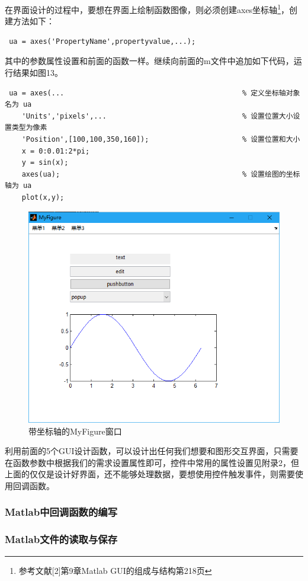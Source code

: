 \begin{enumerate}
	\qquad 在界面设计的过程中，要想在界面上绘制函数图像，则必须创建axes坐标轴\footnote{参考文献[2]第9章Matlab GUI的组成与结构第218页}，创建方法如下：
	\begin{lstlisting}
 ua = axes('PropertyName',propertyvalue,...);\end{lstlisting}
 	其中的参数属性设置和前面的函数一样。继续向前面的m文件中追加如下代码，运行结果如图13。
	 \begin{lstlisting}
 ua = axes(...											% 定义坐标轴对象名为 ua
	'Units','pixels',...								% 设置位置大小设置类型为像素
	'Position',[100,100,350,160]);						% 设置位置和大小
	x = 0:0.01:2*pi;
	y = sin(x);
	axes(ua);											% 设置绘图的坐标轴为 ua
	plot(x,y);\end{lstlisting}
	\begin{figure}[H]
		\centering
		\includegraphics[scale=0.35]{MyFigure_axes}
		\caption{带坐标轴的MyFigure窗口}
	\end{figure}
\end{enumerate}

利用前面的5个GUI设计函数，可以设计出任何我们想要和图形交互界面，只需要在函数参数中根据我们的需求设置属性即可，控件中常用的属性设置见附录2，但上面的仅仅是设计好界面，还不能够处理数据，要想使用控件触发事件，则需要使用回调函数。
\subsubsection{Matlab中回调函数的编写}

\subsubsection{Matlab文件的读取与保存}